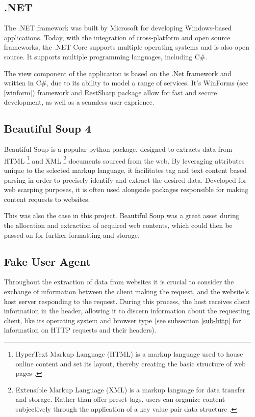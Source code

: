 \documentclass{thesis-ekf}
\theoremstyle{definition}
\theoremstyle{remark}
\begin{document}
{\subsection{.NET}
The .NET framework was built by Microsoft for developing Windows-based applications. Today, with the integration of cross-platform and open source frameworks, the .NET Core supports multiple operating systems and is also open source. It supports multiple programming languages, including C\#. \cite{.net}

The view component of the application is based on the .Net framework and written in C\#, due to its ability to model a range of services. It's WinForms (see \ref{winform}) framework and RestSharp package allow for fast and secure development, as well as a seamless user exprience.

\subsection{Beautiful Soup 4}
Beautiful Soup \cite{bs4} is a popular python package, designed to extracts data from HTML 
  \footnote{HyperText Markup Language (HTML) is a markup language used to house online content and set its layout, thereby creating the basic structure of web pages \cite{mdn-html}.}
and XML 
  \footnote{Extensible Markup Language (XML) is a markup language for data transfer and storage.
  Rather than offer preset tags, users can organize content subjectively through the application of a key value pair data structure \cite{mdn-xml}.}
documents sourced from the web. By leveraging attributes unique to the selected markup language, it facilitates tag and text content based parsing in order to precisely identify and extract the desired data. Developed for web scarping purposes, it is often used alongside packages responsible for making content requests to websites. 

This was also the case in this project. Beautiful Soup was a great asset during the allocation and extraction of acquired web contents, which could then be passed on for further formatting and storage.

\subsection{Fake User Agent}
Throughout the extraction of data from websites it is crucial to consider the exchange of information between the client making the request, and the website's host server responding to the request. During this process, the host receives client information in the header, allowing it to discern information about the requesting client, like its operating system and browser type (see subsection \ref{sub-http} for information on HTTP requests and their headers).

}
\end{document}
